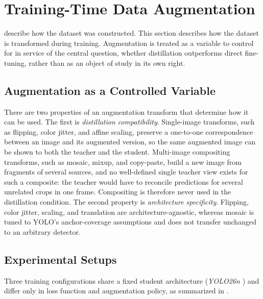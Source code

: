 \section{Training-Time Data Augmentation}\label{sec:data_augmentation}

 describe how the dataset was constructed. This section describes how the dataset is transformed during training. Augmentation is treated as a variable to control for in service of the central question, whether distillation outperforms direct fine-tuning, rather than as an object of study in its own right.

\subsection{Augmentation as a Controlled Variable}\label{sec:augmentation_controlled_variable}

There are two properties of an augmentation transform that determine how it can be used. The first is \emph{distillation compatibility}. Single-image transforms, such as flipping, color jitter, and affine scaling, preserve a one-to-one correspondence between an image and its augmented version, so the same augmented image can be shown to both the teacher and the student. Multi-image compositing transforms, such as mosaic, mixup, and copy-paste, build a new image from fragments of several sources, and no well-defined single teacher view exists for such a composite: the teacher would have to reconcile predictions for several unrelated crops in one frame. Compositing is therefore never used in the distillation condition. The second property is \emph{architecture specificity}. Flipping, color jitter, scaling, and translation are architecture-agnostic, whereas mosaic is tuned to YOLO's anchor-coverage assumptions and does not transfer unchanged to an arbitrary detector.

\subsection{Experimental Setups}\label{sec:augmentation_setups}

Three training configurations share a fixed student architecture (\textit{YOLO26n} \cite{UltralyticsYOLO262025}) and differ only in loss function and augmentation policy, as summarized in .

